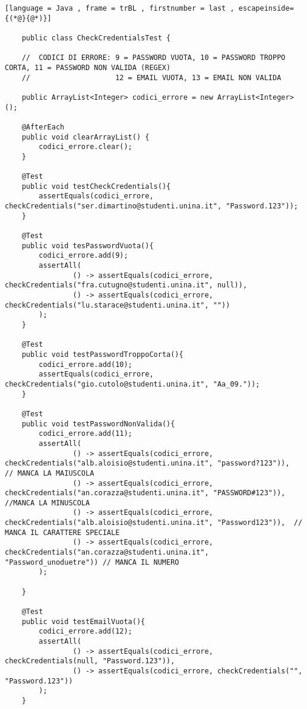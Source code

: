 \begin{lstlisting}[language = Java , frame = trBL , firstnumber = last , escapeinside={(*@}{@*)}]

    public class CheckCredentialsTest {

    //  CODICI DI ERRORE: 9 = PASSWORD VUOTA, 10 = PASSWORD TROPPO CORTA, 11 = PASSWORD NON VALIDA (REGEX)
    //                    12 = EMAIL VUOTA, 13 = EMAIL NON VALIDA

    public ArrayList<Integer> codici_errore = new ArrayList<Integer>();

    @AfterEach
    public void clearArrayList() {
        codici_errore.clear();
    }

    @Test
    public void testCheckCredentials(){
        assertEquals(codici_errore, checkCredentials("ser.dimartino@studenti.unina.it", "Password.123"));
    }

    @Test
    public void tesPasswordVuota(){
        codici_errore.add(9);
        assertAll(
                () -> assertEquals(codici_errore, checkCredentials("fra.cutugno@studenti.unina.it", null)),
                () -> assertEquals(codici_errore, checkCredentials("lu.starace@studenti.unina.it", ""))
        );
    }

    @Test
    public void testPasswordTroppoCorta(){
        codici_errore.add(10);
        assertEquals(codici_errore, checkCredentials("gio.cutolo@studenti.unina.it", "Aa_09."));
    }

    @Test
    public void testPasswordNonValida(){
        codici_errore.add(11);
        assertAll(
                () -> assertEquals(codici_errore, checkCredentials("alb.aloisio@studenti.unina.it", "password?123")),  // MANCA LA MAIUSCOLA
                () -> assertEquals(codici_errore, checkCredentials("an.corazza@studenti.unina.it", "PASSWORD#123")),  //MANCA LA MINUSCOLA
                () -> assertEquals(codici_errore, checkCredentials("alb.aloisio@studenti.unina.it", "Password123")),  // MANCA IL CARATTERE SPECIALE
                () -> assertEquals(codici_errore, checkCredentials("an.corazza@studenti.unina.it", "Password_unoduetre")) // MANCA IL NUMERO
        );

    }

    @Test
    public void testEmailVuota(){
        codici_errore.add(12);
        assertAll(
                () -> assertEquals(codici_errore, checkCredentials(null, "Password.123")),
                () -> assertEquals(codici_errore, checkCredentials("", "Password.123"))
        );
    }


\end{lstlisting}
